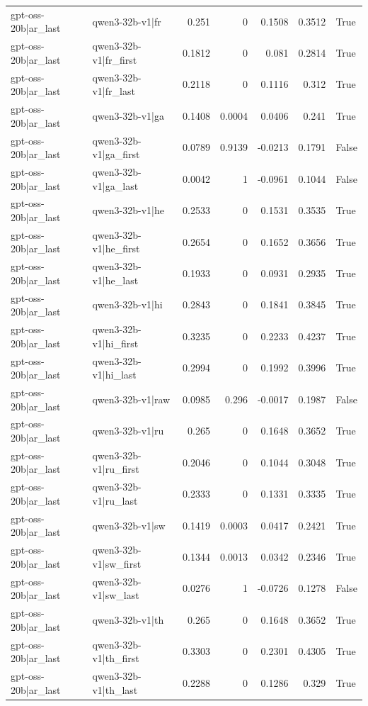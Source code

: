 \begin{table}
\begin{tabular}{l l r r r r l}
gpt-oss-20b|ar_last & qwen3-32b-v1|fr & 0.251 & 0 & 0.1508 & 0.3512 & True \\
gpt-oss-20b|ar_last & qwen3-32b-v1|fr_first & 0.1812 & 0 & 0.081 & 0.2814 & True \\
gpt-oss-20b|ar_last & qwen3-32b-v1|fr_last & 0.2118 & 0 & 0.1116 & 0.312 & True \\
gpt-oss-20b|ar_last & qwen3-32b-v1|ga & 0.1408 & 0.0004 & 0.0406 & 0.241 & True \\
gpt-oss-20b|ar_last & qwen3-32b-v1|ga_first & 0.0789 & 0.9139 & -0.0213 & 0.1791 & False \\
gpt-oss-20b|ar_last & qwen3-32b-v1|ga_last & 0.0042 & 1 & -0.0961 & 0.1044 & False \\
gpt-oss-20b|ar_last & qwen3-32b-v1|he & 0.2533 & 0 & 0.1531 & 0.3535 & True \\
gpt-oss-20b|ar_last & qwen3-32b-v1|he_first & 0.2654 & 0 & 0.1652 & 0.3656 & True \\
gpt-oss-20b|ar_last & qwen3-32b-v1|he_last & 0.1933 & 0 & 0.0931 & 0.2935 & True \\
gpt-oss-20b|ar_last & qwen3-32b-v1|hi & 0.2843 & 0 & 0.1841 & 0.3845 & True \\
gpt-oss-20b|ar_last & qwen3-32b-v1|hi_first & 0.3235 & 0 & 0.2233 & 0.4237 & True \\
gpt-oss-20b|ar_last & qwen3-32b-v1|hi_last & 0.2994 & 0 & 0.1992 & 0.3996 & True \\
gpt-oss-20b|ar_last & qwen3-32b-v1|raw & 0.0985 & 0.296 & -0.0017 & 0.1987 & False \\
gpt-oss-20b|ar_last & qwen3-32b-v1|ru & 0.265 & 0 & 0.1648 & 0.3652 & True \\
gpt-oss-20b|ar_last & qwen3-32b-v1|ru_first & 0.2046 & 0 & 0.1044 & 0.3048 & True \\
gpt-oss-20b|ar_last & qwen3-32b-v1|ru_last & 0.2333 & 0 & 0.1331 & 0.3335 & True \\
gpt-oss-20b|ar_last & qwen3-32b-v1|sw & 0.1419 & 0.0003 & 0.0417 & 0.2421 & True \\
gpt-oss-20b|ar_last & qwen3-32b-v1|sw_first & 0.1344 & 0.0013 & 0.0342 & 0.2346 & True \\
gpt-oss-20b|ar_last & qwen3-32b-v1|sw_last & 0.0276 & 1 & -0.0726 & 0.1278 & False \\
gpt-oss-20b|ar_last & qwen3-32b-v1|th & 0.265 & 0 & 0.1648 & 0.3652 & True \\
gpt-oss-20b|ar_last & qwen3-32b-v1|th_first & 0.3303 & 0 & 0.2301 & 0.4305 & True \\
gpt-oss-20b|ar_last & qwen3-32b-v1|th_last & 0.2288 & 0 & 0.1286 & 0.329 & True \\

\end{tabular}
\end{table}
